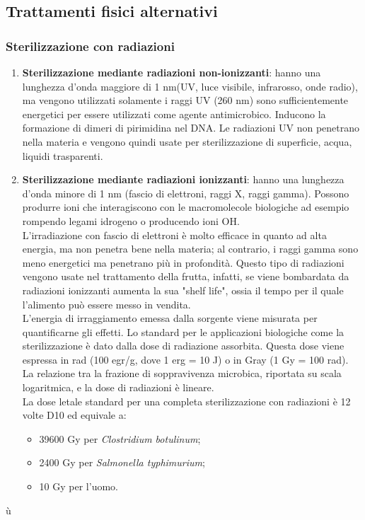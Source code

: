 \subsection{Trattamenti fisici alternativi}
\subsubsection{Sterilizzazione con radiazioni}
\begin{enumerate}
    \item \textbf{Sterilizzazione mediante radiazioni non-ionizzanti}: hanno una lunghezza d'onda maggiore di 1 nm(UV, luce visibile, infrarosso, onde radio), ma vengono utilizzati solamente i raggi UV (260 nm) sono sufficientemente energetici per essere utilizzati come agente antimicrobico. Inducono la formazione di dimeri di pirimidina nel DNA. Le radiazioni UV non penetrano nella materia e vengono quindi usate per sterilizzazione di superficie, acqua, liquidi trasparenti.
    \item \textbf{Sterilizzazione mediante radiazioni ionizzanti}: hanno una lunghezza d'onda minore di 1 nm (fascio di elettroni, raggi X, raggi gamma). Possono produrre ioni che interagiscono con le macromolecole biologiche ad esempio rompendo legami idrogeno o producendo ioni OH\ap{-}. 
    \\L'irradiazione con fascio di elettroni è molto efficace in quanto ad alta energia, ma non penetra bene nella materia; al contrario, i raggi gamma sono meno energetici ma penetrano più in profondità. Questo tipo di radiazioni vengono usate nel trattamento della frutta, infatti, se viene bombardata da radiazioni ionizzanti aumenta la sua "shelf life", ossia il tempo per il quale l'alimento può essere messo in vendita.
    \\L'energia di irraggiamento emessa dalla sorgente viene misurata per quantificarne gli effetti. Lo standard per le applicazioni biologiche come la sterilizzazione è dato dalla dose di radiazione assorbita. Questa dose viene espressa in rad (100 egr/g, dove 1 erg = 10 J) o in Gray (1 Gy = 100 rad). La relazione tra la frazione di soppravivenza microbica, riportata su scala logaritmica, e la dose di radiazioni è lineare. 
    \\La dose letale standard per una completa sterilizzazione con radiazioni è 12 volte D10 ed equivale a:
    \begin{itemize}
        \item 39600 Gy per \textit{Clostridium botulinum}; 
        \item 2400 Gy per \textit{Salmonella typhimurium}; 
        \item 10 Gy per l'uomo.
    \end{itemize}
\end{enumerate}ù
